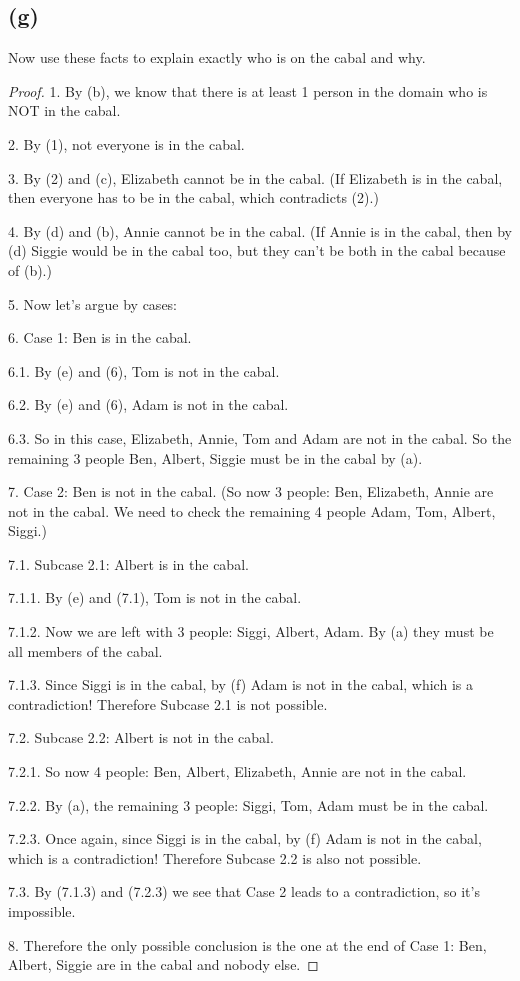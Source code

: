 \documentclass[14pt]{extarticle}
\begin{document}
\subsection{(g)}
Now use these facts to explain exactly who is on the cabal and why.
\begin{proof}
1. By (b), we know that there is at least 1 person in the domain who is NOT in the cabal.

2. By (1), not everyone is in the cabal.

3. By (2) and (c), Elizabeth cannot be in the cabal. (If Elizabeth is in the cabal, then everyone has to be in the cabal, which contradicts (2).)

4. By (d) and (b), Annie cannot be in the cabal. (If Annie is in the cabal, then by (d) Siggie would be in the cabal too, but they can't be both in the cabal because of (b).)

5. Now let's argue by cases:

6. Case 1: Ben is in the cabal.

6.1. By (e) and (6), Tom is not in the cabal.

6.2. By (e) and (6), Adam is not in the cabal.

6.3. So in this case, Elizabeth, Annie, Tom and Adam are not in the cabal. So the remaining 3 people Ben, Albert, Siggie must be in the cabal by (a).

7. Case 2: Ben is not in the cabal. (So now 3 people: Ben, Elizabeth, Annie are not in the cabal. We need to check the remaining 4 people Adam, Tom, Albert, Siggi.)

7.1. Subcase 2.1: Albert is in the cabal.

7.1.1. By (e) and (7.1), Tom is not in the cabal.

7.1.2. Now we are left with 3 people: Siggi, Albert, Adam. By (a) they must be all members of the cabal.

7.1.3. Since Siggi is in the cabal, by (f) Adam is not in the cabal, which is a contradiction! Therefore Subcase 2.1 is not possible.

7.2. Subcase 2.2: Albert is not in the cabal. 

7.2.1. So now 4 people: Ben, Albert, Elizabeth, Annie are not in the cabal. 

7.2.2. By (a), the remaining 3 people: Siggi, Tom, Adam must be in the cabal.

7.2.3. Once again, since Siggi is in the cabal, by (f) Adam is not in the cabal, which is a contradiction! Therefore Subcase 2.2 is also not possible.

7.3. By (7.1.3) and (7.2.3) we see that Case 2 leads to a contradiction, so it's impossible.

8. Therefore the only possible conclusion is the one at the end of Case 1: Ben, Albert, Siggie are in the cabal and nobody else.
\end{proof}
\end{document}
